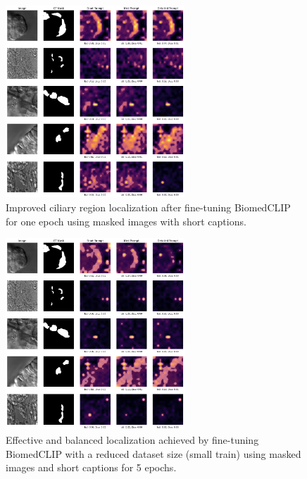 \documentclass[./dissertation.tex]{subfiles}
\begin{document}
\begin{figure}
    \centering
    \includegraphics[width=0.6\textwidth]{figures/sam/fine-tuned 1ep with mask short caption th 0.4.png}
    \caption{Improved ciliary region localization after fine-tuning BiomedCLIP for one epoch using masked images with short captions.}
    \label{fig:fine_tuned_mask_short_ep1}
\end{figure}

\begin{figure}
    \centering
    \includegraphics[width=0.6\textwidth]{figures/sam/fine-tuned masks small train short desc ep5.png}
    \caption{Effective and balanced localization achieved by fine-tuning BiomedCLIP with a reduced dataset size (small train) using masked images and short captions for 5 epochs.}
    \label{fig:fine_tuned_mask_small_short_ep5}
\end{figure}
\end{document}

